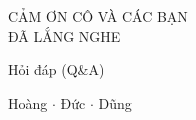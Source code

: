 {
\begin{frame}[plain,label=thanks]
  \centering
  \vspace{1.2cm}
  {\bungee\color{inkblue}\fontsize{17}{21}\selectfont CẢM ƠN CÔ VÀ CÁC BẠN\\ĐÃ LẮNG NGHE}\par
  \vspace{0.5cm}
  {\bevnsemi\color{brandblue}\small Hỏi đáp (Q\&A)}\par
  \vspace{0.3cm}
  {\bevnsemi\color{footernavy}\footnotesize Hoàng $\cdot$ Đức $\cdot$ Dũng}
\end{frame}}
